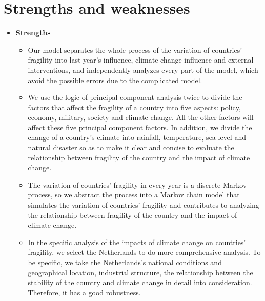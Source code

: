 \documentclass{mcmthesis}
\begin{document}
	\section{Strengths and weaknesses}
	\begin{itemize}
		\item \large{\textbf{Strengths}}
		\normalsize
		\begin{itemize}
			\item Our model separates the whole process of the variation of countries' fragility into last year's influence, climate change influence and external interventions, and independently analyzes every part of the model, which avoid the possible errors due to the complicated model.
			\item We use the logic of principal component analysis twice to divide the factors that affect the fragility of a country into five aspects: policy, economy, military, society and climate change. All the other factors will affect these five principal component factors. In addition, we divide the change of a country's climate into rainfall, temperature, sea level and natural disaster so as to make it clear and concise to evaluate the relationship between fragility of the country and the impact of climate change.
			\item The variation of countries' fragility in every year is a discrete Markov process, so we abstract the process into a Markov chain model that simulates the variation of countries' fragility and contributes to analyzing the relationship between fragility of the country and the impact of climate change.		
			\item In the specific analysis of the impacts of climate change on countries' fragility, we select the Netherlands to do more comprehensive analysis. To be specific, we take the Netherlands's national conditions and geographical location, industrial structure, the relationship between the stability of the country and climate change in detail into consideration. Therefore, it has a good robustness.	
		\end{itemize}


\end{itemize}
\end{document}
